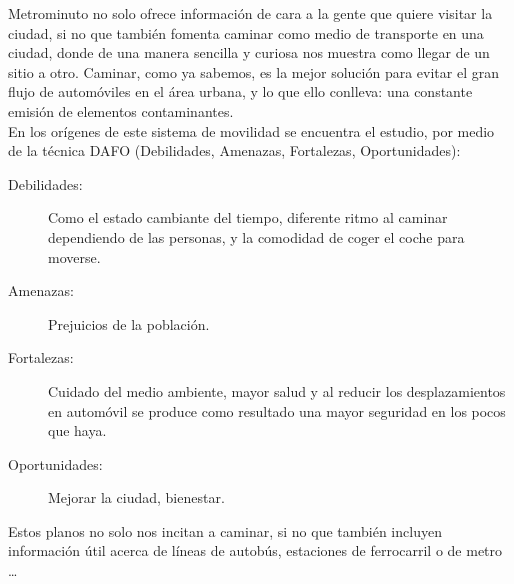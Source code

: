 Metrominuto no solo ofrece información de cara a la gente que quiere visitar la ciudad, si no que también fomenta caminar como medio de transporte en una ciudad, donde de una manera sencilla y curiosa nos muestra como llegar de un sitio a otro. Caminar, como ya sabemos, es la mejor solución para evitar el gran flujo de automóviles en el área urbana, y lo que ello conlleva: una constante emisión de elementos contaminantes. \\
En los orígenes de este sistema de movilidad se encuentra el estudio, por medio de la técnica DAFO (Debilidades, Amenazas, Fortalezas, Oportunidades):

\begin{description}
	\item[Debilidades:] Como el estado cambiante del tiempo, diferente ritmo al caminar dependiendo de las personas, y la comodidad de coger el coche para moverse.
	\item[Amenazas:] Prejuicios de la población.
	\item[Fortalezas:] Cuidado del medio ambiente, mayor salud y al reducir los desplazamientos en automóvil se produce como resultado una mayor seguridad en los pocos que haya.
	\item[Oportunidades:] Mejorar la ciudad, bienestar.
\end{description}
Estos planos no solo nos incitan a caminar, si no que también incluyen información útil acerca de líneas de autobús, estaciones de ferrocarril o de metro \dots

